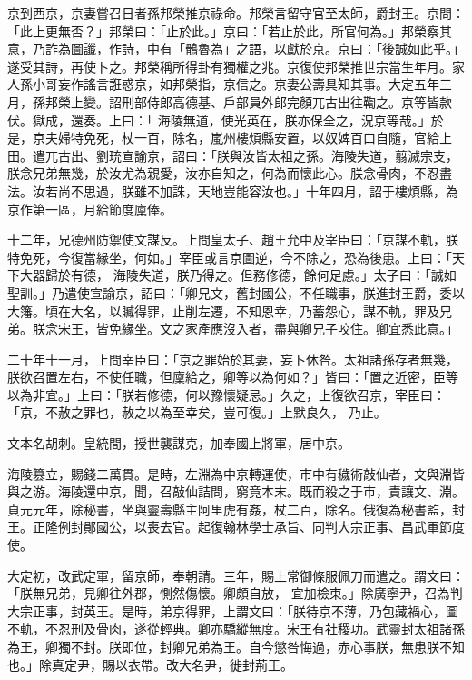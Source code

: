 \begin{pinyinscope}
 京到西京，京妻嘗召日者孫邦榮推京祿命。邦榮言留守官至太師，爵封王。京問：「此上更無否？」邦榮曰：「止於此。」京曰：「若止於此，所官何為。」邦榮察其意，乃詐為圖讖，作詩，中有「鶻魯為」之語，以獻於京。京曰：「後誠如此乎。」遂受其詩，再使卜之。邦榮稱所得卦有獨權之兆。京復使邦榮推世宗當生年月。家人孫小哥妄作謠言誑惑京，如邦榮指，京信之。京妻公壽具知其事。大定五年三月，孫邦榮上變。詔刑部侍郎高德基、戶部員外郎完顏兀古出往鞫之。京等皆款伏。獄成，還奏。上曰：「
 海陵無道，使光英在，朕亦保全之，況京等哉。」於是，京夫婦特免死，杖一百，除名，嵐州樓煩縣安置，以奴婢百口自隨，官給上田。遣兀古出、劉珫宣諭京，詔曰：「朕與汝皆太祖之孫。海陵失道，翦滅宗支，朕念兄弟無幾，於汝尤為親愛，汝亦自知之，何為而懷此心。朕念骨肉，不忍盡法。汝若尚不思過，朕雖不加誅，天地豈能容汝也。」十年四月，詔于樓煩縣，為京作第一區，月給節度廩俸。



 十二年，兄德州防禦使文謀反。上問皇太子、趙王允中及宰臣曰：「京謀不軌，朕特免死，今復當緣坐，何如。」宰臣或言京圖逆，今不除之，恐為後患。上曰：「天下大器歸於有德，
 海陵失道，朕乃得之。但務修德，餘何足慮。」太子曰：「誠如聖訓。」乃遣使宣諭京，詔曰：「卿兄文，舊封國公，不任職事，朕進封王爵，委以大籓。頃在大名，以贓得罪，止削左遷，不知恩幸，乃蓄怨心，謀不軌，罪及兄弟。朕念宋王，皆免緣坐。文之家產應沒入者，盡與卿兄子咬住。卿宜悉此意。」



 二十年十一月，上問宰臣曰：「京之罪始於其妻，妄卜休咎。太祖諸孫存者無幾，朕欲召置左右，不使任職，但廩給之，卿等以為何如？」皆曰：「置之近密，臣等以為非宜。」上曰：「朕若修德，何以豫懷疑忌。」久之，上復欲召京，宰臣曰：「京，不赦之罪也，赦之以為至幸矣，豈可復。」上默良久，
 乃止。



 文本名胡刺。皇統間，授世襲謀克，加奉國上將軍，居中京。



 海陵篡立，賜錢二萬貫。是時，左淵為中京轉運使，市中有穢術敲仙者，文與淵皆與之游。海陵還中京，聞，召敲仙詰問，窮竟本末。既而殺之于市，責讓文、淵。貞元元年，除秘書，坐與靈壽縣主阿里虎有姦，杖二百，除名。俄復為秘書監，封王。正隆例封鄖國公，以喪去官。起復翰林學士承旨、同判大宗正事、昌武軍節度使。



 大定初，改武定軍，留京師，奉朝請。三年，賜上常御條服佩刀而遣之。謂文曰：「朕無兄弟，見卿往外郡，惻然傷懷。卿頗自放，
 宜加檢束。」除廣寧尹，召為判大宗正事，封英王。是時，弟京得罪，上謂文曰：「朕待京不薄，乃包藏禍心，圖不軌，不忍刑及骨肉，遂從輕典。卿亦驕縱無度。宋王有社稷功。武靈封太祖諸孫為王，卿獨不封。朕即位，封卿兄弟為王。自今懲咎悔過，赤心事朕，無患朕不知也。」除真定尹，賜以衣帶。改大名尹，徙封荊王。




\end{pinyinscope}
